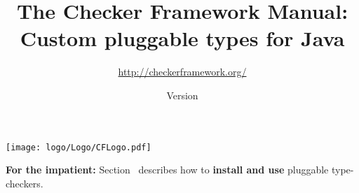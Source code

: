 \documentclass[10pt]{report}
\title{The Checker Framework Manual: \\ Custom pluggable types for Java}
\author{\url{http://checkerframework.org/}}
\date{Version \ReleaseInfo{}}
\begin{document}
\begin{center}
  \texttt{[image: logo/Logo/CFLogo.pdf]}
\end{center}

{\let\newpage\relax \maketitle}


\noindent
\textbf{For the impatient:}
Section~
describes how to \textbf{install and use} pluggable type-checkers.

\tableofcontents
\newpage









































\htmlhr


\end{document}
